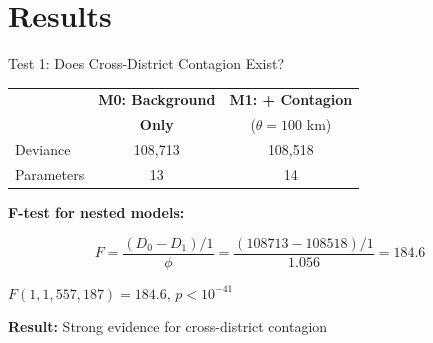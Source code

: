\documentclass[aspectratio=169]{beamer}
\begin{document}

\section{Results}

\begin{frame}{Test 1: Does Cross-District Contagion Exist?}

\begin{center}
\begin{tabular}{lcc}
\toprule
& \textbf{M0: Background} & \textbf{M1: + Contagion} \\
& \textbf{Only} & ($\theta = 100$ km) \\
\midrule
Deviance & 108,713 & 108,518 \\
Parameters & 13 & 14 \\
\bottomrule
\end{tabular}
\end{center}

\vspace{1em}

\textbf{F-test for nested models:}

\begin{equation*}
F = \frac{(D_0 - D_1)/1}{\phi} = \frac{(108713 - 108518)/1}{1.056} = 184.6
\end{equation*}

\vspace{0.5em}

\begin{center}
$F(1, 1{,}557{,}187) = 184.6$, \quad $p < 10^{-41}$
\end{center}

\vspace{0.5em}

\textbf{Result:} Strong evidence for cross-district contagion

\end{frame}
\end{document}
